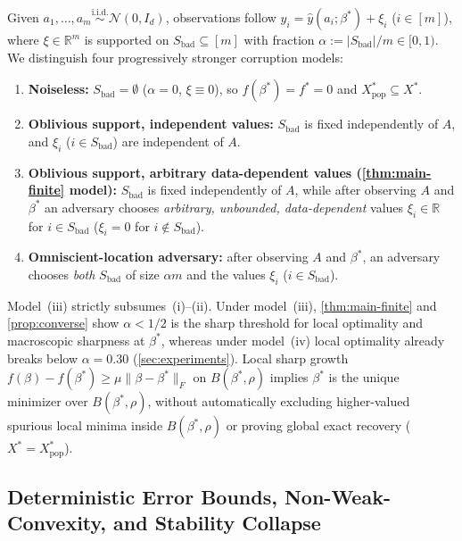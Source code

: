 \documentclass[11pt]{article}
\theoremstyle{plain}
\theoremstyle{remark}
\numberwithin{equation}{section}
\newcommand{\R}{\mathbb{R}}
\newcommand{\Fnorm}[1]{\|#1\|_F}
\begin{document}
Given $a_1, \dots, a_m \stackrel{\mathrm{i.i.d.}}{\sim} \mathcal{N}(0, I_d)$, observations follow $y_i = \hat y(a_i; \beta^*) + \xi_i$ ($i \in [m]$), where $\xi \in \R^m$ is supported on $S_{\mathrm{bad}} \subseteq [m]$ with fraction $\alpha := |S_{\mathrm{bad}}| / m \in [0, 1)$. We distinguish four progressively stronger corruption models:
\begin{enumerate}[label=(\roman*)]
  \item \textbf{Noiseless:} $S_{\mathrm{bad}} = \emptyset$ ($\alpha = 0$, $\xi \equiv 0$), so $f(\beta^*) = f^* = 0$ and $X_{\mathrm{pop}}^* \subseteq X^*$.
  \item \textbf{Oblivious support, independent values:} $S_{\mathrm{bad}}$ is fixed independently of $A$, and $\xi_i$ ($i \in S_{\mathrm{bad}}$) are independent of $A$.
  \item \textbf{Oblivious support, arbitrary data-dependent values (\cref{thm:main-finite} model):} $S_{\mathrm{bad}}$ is fixed independently of $A$, while after observing $A$ and $\beta^*$ an adversary chooses \emph{arbitrary, unbounded, data-dependent} values $\xi_i \in \R$ for $i \in S_{\mathrm{bad}}$ ($\xi_i = 0$ for $i \notin S_{\mathrm{bad}}$).
  \item \textbf{Omniscient-location adversary:} after observing $A$ and $\beta^*$, an adversary chooses \emph{both} $S_{\mathrm{bad}}$ of size $\alpha m$ and the values $\xi_i$ ($i \in S_{\mathrm{bad}}$).
\end{enumerate}
Model~(iii) strictly subsumes~(i)--(ii). Under model~(iii), \cref{thm:main-finite} and \cref{prop:converse} show $\alpha < 1/2$ is the sharp threshold for local optimality and macroscopic sharpness at $\beta^*$, whereas under model~(iv) local optimality already breaks below $\alpha = 0.30$ (\cref{sec:experiments}). Local sharp growth $f(\beta) - f(\beta^*) \ge \mu\Fnorm{\beta - \beta^*}$ on $B(\beta^*, \rho)$ implies $\beta^*$ is the unique minimizer over $B(\beta^*, \rho)$, without automatically excluding higher-valued spurious local minima inside $B(\beta^*, \rho)$ or proving global exact recovery ($X^* = X_{\mathrm{pop}}^*$).

\subsection{Deterministic Error Bounds, Non-Weak-Convexity, and Stability Collapse}
\label{sec:deterministic-diag}
\end{document}
